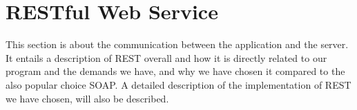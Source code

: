 \section{RESTful Web Service}
\label{sec:rest}

This section is about the communication between the application and the server. It entails a description of REST overall and how it is directly related to our program and the demands we have, and why we have chosen it compared to the also popular choice SOAP. A detailed description of the implementation of REST we have chosen, will also be described. 



